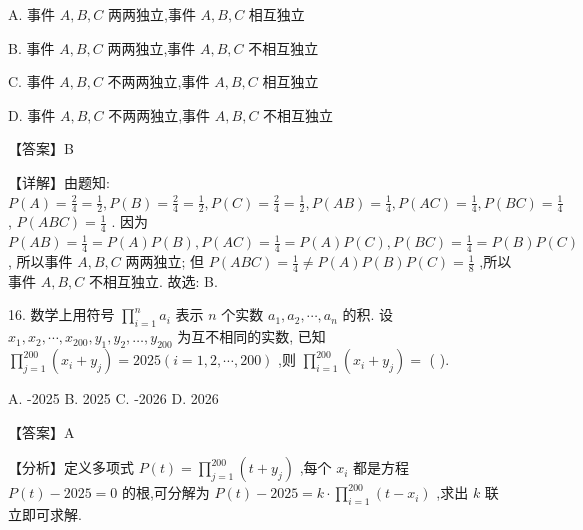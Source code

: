 \documentclass[10pt]{article}
\begin{document}
A. 事件 \(A,B,C\) 两两独立,事件 \(A,B,C\) 相互独立

B. 事件 \(A,B,C\) 两两独立,事件 \(A,B,C\) 不相互独立

C. 事件 \(A,B,C\) 不两两独立,事件 \(A,B,C\) 相互独立

D. 事件 \(A,B,C\) 不两两独立,事件 \(A,B,C\) 不相互独立

【答案】B

【详解】由题知: \(P\left( A\right)  = \frac{2}{4} = \frac{1}{2},P\left( B\right)  = \frac{2}{4} = \frac{1}{2},P\left( C\right)  = \frac{2}{4} = \frac{1}{2},P\left( {AB}\right)  = \frac{1}{4},P\left( {AC}\right)  = \frac{1}{4},P\left( {BC}\right)  = \frac{1}{4}\) , \(P\left( {ABC}\right)  = \frac{1}{4}\) . 因为 \(P\left( {AB}\right)  = \frac{1}{4} = P\left( A\right) P\left( B\right) ,P\left( {AC}\right)  = \frac{1}{4} = P\left( A\right) P\left( C\right) ,P\left( {BC}\right)  = \frac{1}{4} = P\left( B\right) P\left( C\right)\) , 所以事件 \(A,B,C\) 两两独立; 但 \(P\left( {ABC}\right)  = \frac{1}{4} \neq  P\left( A\right) P\left( B\right) P\left( C\right)  = \frac{1}{8}\) ,所以事件 \(A,B,C\) 不相互独立. 故选: B.

16. 数学上用符号 \(\mathop{\prod }\limits_{{i = 1}}^{n}{a}_{i}\) 表示 \(n\) 个实数 \({a}_{1},{a}_{2},\cdots ,{a}_{n}\) 的积. 设 \({x}_{1},{x}_{2},\cdots ,{x}_{200},{y}_{1},{y}_{2},\ldots ,{y}_{200}\) 为互不相同的实数, 已知 \(\mathop{\prod }\limits_{{j = 1}}^{{200}}\left( {{x}_{i} + {y}_{j}}\right)  = {2025}\left( {i = 1,2,\cdots ,{200}}\right)\) ,则 \(\mathop{\prod }\limits_{{i = 1}}^{{200}}\left( {{x}_{i} + {y}_{j}}\right)  =\) (   ).

A. -2025 B. 2025 C. -2026 D. 2026

【答案】A

【分析】定义多项式 \(P\left( t\right)  = \mathop{\prod }\limits_{{j = 1}}^{{200}}\left( {t + {y}_{j}}\right)\) ,每个 \({x}_{i}\) 都是方程 \(P\left( t\right)  - {2025} = 0\) 的根,可分解为 \(P\left( t\right)  - {2025} = k \cdot  \mathop{\prod }\limits_{{i = 1}}^{{200}}\left( {t - {x}_{i}}\right)\) ,求出 \(k\) 联立即可求解.
\end{document}
